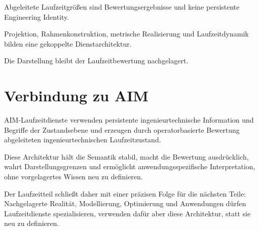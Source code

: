 \begin{proposition}
Abgeleitete Laufzeitgrößen sind Bewertungsergebnisse und keine persistente
Engineering Identity.
\end{proposition}

\begin{proposition}
Projektion, Rahmenkonstruktion, metrische Realisierung und Laufzeitdynamik
bilden eine gekoppelte Dienstarchitektur.
\end{proposition}

\begin{proposition}
Die Darstellung bleibt der Laufzeitbewertung nachgelagert.
\end{proposition}

\section{Verbindung zu AIM}

\begin{summary}
AIM-Laufzeitdienste verwenden persistente ingenieurtechnische Information und
Begriffe der Zustandsebene und erzeugen durch operatorbasierte Bewertung
abgeleiteten ingenieurtechnischen Laufzeitzustand.

Diese Architektur hält die Semantik stabil, macht die Bewertung ausdrücklich,
wahrt Darstellungsgrenzen und ermöglicht anwendungsspezifische Interpretation,
ohne vorgelagertes Wissen neu zu definieren.

Der Laufzeitteil schließt daher mit einer präzisen Folge für die nächsten
Teile: Nachgelagerte Realität, Modellierung, Optimierung und Anwendungen dürfen
Laufzeitdienste spezialisieren, verwenden dafür aber diese Architektur, statt
sie neu zu definieren.
\end{summary}

